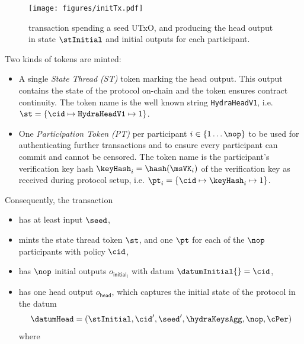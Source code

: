 \begin{figure}
	\centering
	\texttt{[image: figures/initTx.pdf]}
	\caption{\mtxInit{} transaction spending a seed UTxO, and producing the head
		output in state $\stInitial$ and initial outputs for each participant.}\label{fig:initTx}
\end{figure}

\noindent Two kinds of tokens are minted:
\begin{itemize}
	\item A single \emph{State Thread (ST)} token marking the head output. This
	      output contains the state of the protocol on-chain and the token ensures
	      contract continuity. The token name is the well known string
	      \texttt{HydraHeadV1}, i.e.
	      $\st = \{\cid \mapsto \texttt{HydraHeadV1} \mapsto 1\}$.
	\item One \emph{Participation Token (PT)} per participant
	      $i \in \{1 \dots \nop \}$ to be used for authenticating further
	      transactions and to ensure every participant can commit and cannot be
	      censored. The token name is the participant's verification key hash
	      $\keyHash_{i} = \hash(\msVK_{i})$ of the verification key as received
	      during protocol setup, i.e.
	      $\pt_{i} = \{\cid \mapsto \keyHash_{i} \mapsto 1\}$.
\end{itemize}

\noindent Consequently, the \mtxInit{} transaction
\begin{itemize}
	\item has at least input $\seed$,
	\item mints the state thread token $\st$, and one $\pt$ for each of the $\nop$
	      participants with policy $\cid$,
	\item has $\nop$ initial outputs $o_{\mathsf{initial}_{i}}$ with datum $\datumInitial{} = \cid$,
	\item has one head output
	      $o_{\mathsf{head}}$, which captures
	      the initial state of the protocol in the datum
	      \[
		      \datumHead = (\stInitial,\cid',\seed',\hydraKeysAgg,\nop,\cPer)
	      \]
	      where
\end{itemize}

